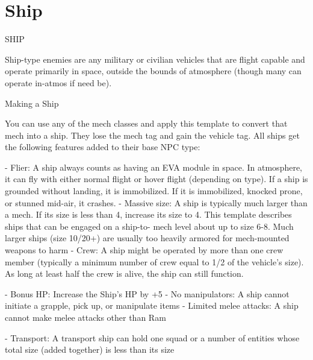 \section{Ship}
                                                    SHIP   

Ship-type enemies are any military or civilian vehicles that are flight capable and operate primarily  
in space, outside the bounds of atmosphere (though many can operate in-atmos if need be).
 

Making a Ship
 
You can use any of the mech classes and apply this template to convert that mech into a ship.  
They lose the mech tag and gain the vehicle tag. All ships get the following features added to  
their base NPC type:
 
    -    Flier: A ship always counts as having an EVA module in space. In atmosphere, it can fly  
        with either normal flight or hover flight (depending on type). If a ship is grounded without  
         landing, it is immobilized. If it is immobilized, knocked prone, or stunned mid-air, it  
        crashes.  
    -    Massive size: A ship is typically much larger than a mech. If its size is less than 4,  
         increase its size to 4. This template describes ships that can be engaged on a ship-to- 
         mech level about up to size 6-8. Much larger ships (size 10/20+) are usually too heavily  
        armored for mech-mounted weapons to harm  
    -   Crew: A ship might be operated by more than one crew member (typically a minimum  
         number of crew equal to 1/2 of the vehicle’s size). As long at least half the crew is alive, the  
        ship can still function.
 
    -    Bonus HP: Increase the Ship’s HP by +5  
    -    No manipulators: A ship cannot initiate a grapple, pick up, or manipulate items  
    -    Limited melee attacks: A ship cannot make melee attacks other than Ram
 

                                                                                                            


-   Transport: A transport ship can hold one squad or a number of entities whose total size  
    (added together) is less than its size  

                                              